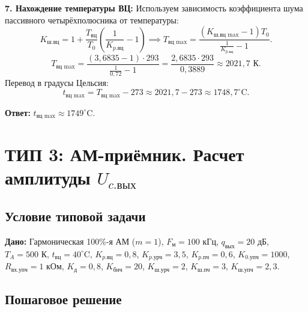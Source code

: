 \documentclass[12pt,a4paper]{article}
\begin{document}
\textbf{7. Нахождение температуры ВЦ:}
Используем зависимость коэффициента шума пассивного четырёхполюсника от температуры:
\begin{equation}
K_{\text{ш.вц}} = 1 + \frac{T_{\text{вц}}}{T_0} \left( \frac{1}{K_{p.\text{вц}}} - 1 \right) \implies T_{\text{вц max}} = \frac{(K_{\text{ш.вц max}} - 1) T_0}{\frac{1}{K_{p.\text{вц}}} - 1}.
\end{equation}
\begin{equation}
T_{\text{вц max}} = \frac{(3{,}6835 - 1) \cdot 293}{\frac{1}{0{,}72} - 1} = \frac{2{,}6835 \cdot 293}{0{,}3889} \approx 2021{,}7\text{ К}.
\end{equation}
Перевод в градусы Цельсия:
\begin{equation}
t_{\text{вц max}} = T_{\text{вц max}} - 273 \approx 2021{,}7 - 273 \approx 1748{,}7^\circ\text{C}.
\end{equation}

\textbf{Ответ:} $t_{\text{вц max}} \approx 1749^\circ\text{C}$.

\newpage
\section{ТИП 3: АМ-приёмник. Расчет амплитуды $U_{c.\text{вых}}$}

\subsection{Условие типовой задачи}
\textbf{Дано:} Гармоническая 100\%-я АМ ($m = 1$), $F_{\text{м}} = 100\text{ кГц}$, $q_{\text{вых}} = 20\text{ дБ}$, $T_A = 500\text{ К}$, $t_{\text{вц}} = 40^\circ\text{C}$, $K_{p.\text{вц}} = 0{,}8$, $K_{p.\text{урч}} = 3{,}5$, $K_{p.\text{пч}} = 0{,}6$, $K_{0.\text{упч}} = 1000$, $R_{\text{вх.упч}} = 1\text{ кОм}$, $K_{\text{д}} = 0{,}8$, $K_{\text{бнч}} = 20$, $K_{\text{ш.урч}} = 2$, $K_{\text{ш.пч}} = 3$, $K_{\text{ш.упч}} = 2{,}3$.

\subsection{Пошаговое решение}
\end{document}
